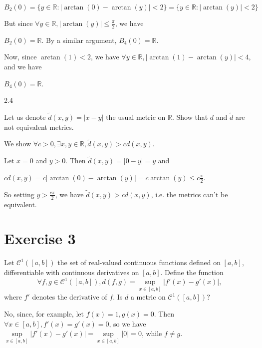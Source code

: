 \documentclass[12pt,a4paper]{article}
\begin{document}
	$B_2(0) = \{y \in \mathbb{R} : \vert \arctan(0) - \arctan(y) \vert < 2\} = \{y \in \mathbb{R} : \vert \arctan(y) \vert < 2 \}$
	
	But since $\forall y \in \mathbb{R}, \vert \arctan(y) \vert \le \frac{\pi}{2}$, we have
	
	$B_2(0) = \mathbb{R}$. By a similar argument, $B_4(0) = \mathbb{R}$.
	
	Now, since $\arctan(1) < 2$, we have $\forall y \in \mathbb{R}, \vert \arctan(1) - \arctan(y) \vert < 4$, and we have
	
	$B_4(0) = \mathbb{R}$.
	 
\vspace{5 mm}
2.4
\begin{ques}
	Let us denote $\tilde{d}(x,y) = \vert x-y \vert$ the usual metric on $\mathbb{R}$. Show that $d$ and $\tilde{d}$ are not equivalent metrics.
\end{ques}
	
	We show $\forall c > 0, \exists x,y \in \mathbb{R}, \tilde{d}(x,y) > cd(x,y)$.
	
	Let $x = 0$ and $y > 0$. Then $\tilde{d}(x,y) = \vert 0 - y \vert = y$ and 
	
	$cd(x,y) = c \vert \arctan(0) - \arctan(y) \vert = c \arctan(y)\leq c \frac{\pi}{2}$.
	
	So setting $y > \frac{c\pi}{2}$, we have $\tilde{d}(x,y) > cd(x,y)$, i.e. the metrics can't be equivalent.
	
\vspace{5 mm}	
\section*{Exercise 3}
\begin{ques}
	Let $\mathcal{C}^1([a,b])$ the set of real-valued continuous functions defined on $[a,b]$, differentiable with continuous derivatives on $[a,b]$. Define the function
	$$\forall f,g \in \mathcal{C}^1([a,b]), d(f,g) = \underset{x\in[a,b]}{\sup} \vert f'(x) - g'(x) \vert,$$
	where $f'$ denotes the derivative of $f$. Is $d$ a metric on $\mathcal{C}^1([a,b])$?
\end{ques}
	
	No, since, for example, let $f(x) = 1, g(x) = 0$. Then $\forall x \in [a,b], f'(x) = g'(x) = 0$, so we have $\underset{x \in [a,b]}{\sup} \vert f'(x) - g'(x) \vert = \underset{x \in [a,b]}{\sup} \vert 0\vert = 0$, while $f \neq g$.
	
	
	
	
\end{document}
